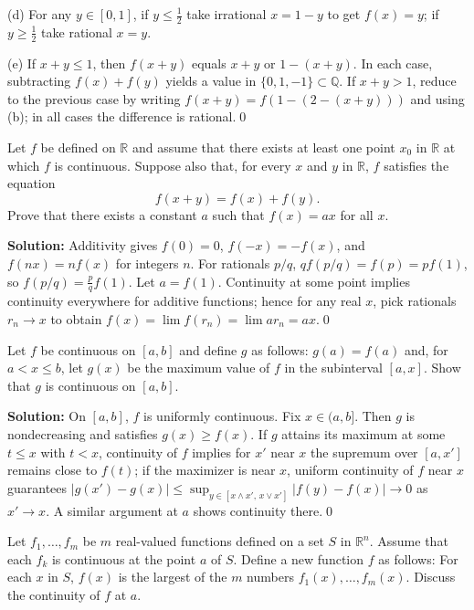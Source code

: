 (d) For any $y\in[0,1]$, if $y\le \tfrac12$ take irrational $x=1-y$ to get $f(x)=y$; if $y\ge \tfrac12$ take rational $x=y$.

(e) If $x+y\le 1$, then $f(x+y)$ equals $x+y$ or $1-(x+y)$. In each case, subtracting $f(x)+f(y)$ yields a value in $\{0,1,-1\}\subset \mathbb{Q}$. If $x+y>1$, reduce to the previous case by writing $f(x+y)=f(1-(2-(x+y)))$ and using (b); in all cases the difference is rational.\qed



\begin{problembox}
Let \( f \) be defined on \( \mathbb{R} \) and assume that there exists at least one point \( x_0 \) in \( \mathbb{R} \) at which \( f \) is continuous. Suppose also that, for every \( x \) and \( y \) in \( \mathbb{R} \), \( f \) satisfies the equation
\[f(x + y) = f(x) + f(y).\]
Prove that there exists a constant \( a \) such that \( f(x) = ax \) for all \( x \).
\end{problembox}

\noindent\textbf{Solution:}
Additivity gives $f(0)=0$, $f(-x)=-f(x)$, and $f(nx)=nf(x)$ for integers $n$. For rationals $p/q$, $qf(p/q)=f(p)=pf(1)$, so $f(p/q)=\tfrac{p}{q}f(1)$. Let $a=f(1)$. Continuity at some point implies continuity everywhere for additive functions; hence for any real $x$, pick rationals $r_n\to x$ to obtain $f(x)=\lim f(r_n)=\lim ar_n=ax$.\qed



\begin{problembox}
Let \( f \) be continuous on \([a, b]\) and define \( g \) as follows: \( g(a) = f(a) \) and, for \( a < x \leq b \), let \( g(x) \) be the maximum value of \( f \) in the subinterval \([a, x]\). Show that \( g \) is continuous on \([a, b]\).
\end{problembox}

\noindent\textbf{Solution:}
On $[a,b]$, $f$ is uniformly continuous. Fix $x\in(a,b]$. Then $g$ is nondecreasing and satisfies $g(x)\ge f(x)$. If $g$ attains its maximum at some $t\le x$ with $t<x$, continuity of $f$ implies for $x'$ near $x$ the supremum over $[a,x']$ remains close to $f(t)$; if the maximizer is near $x$, uniform continuity of $f$ near $x$ guarantees $|g(x')-g(x)|\le \sup_{y\in[x\wedge x',\,x\vee x']}|f(y)-f(x)|\to 0$ as $x'\to x$. A similar argument at $a$ shows continuity there.\qed



\begin{problembox}
Let \( f_1, \ldots, f_m \) be \( m \) real-valued functions defined on a set \( S \) in \( \mathbb{R}^n \). Assume that each \( f_k \) is continuous at the point \( a \) of \( S \). Define a new function \( f \) as follows: For each \( x \) in \( S \), \( f(x) \) is the largest of the \( m \) numbers \( f_1(x), \ldots, f_m(x) \). Discuss the continuity of \( f \) at \( a \).
\end{problembox}

